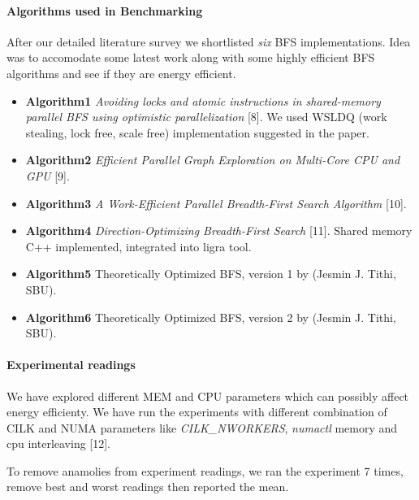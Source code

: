 \paragraph{Algorithms used in Benchmarking}
After our detailed literature survey we shortlisted \emph{six} BFS
implementations.  Idea was to accomodate some latest work along with some
highly efficient BFS algorithms and see if they are energy efficient.
\begin{itemize}[leftmargin=*]
\item \textbf{Algorithm1}
\emph{Avoiding locks and atomic instructions in shared-memory parallel
BFS using optimistic parallelization} [8]. We used WSLDQ (work
stealing, lock free, scale free) implementation suggested in the
paper.
\item \textbf{Algorithm2}
\emph{Efficient Parallel Graph Exploration on Multi-Core CPU and GPU}
[9].
\item \textbf{Algorithm3}
\emph{A Work-Efficient Parallel Breadth-First Search Algorithm} [10].
\item \textbf{Algorithm4}
\emph{Direction-Optimizing Breadth-First Search} [11]. Shared memory
C++ implemented, integrated into ligra tool.
\item \textbf{Algorithm5}
Theoretically Optimized BFS, version 1 by (Jesmin J. Tithi, SBU).
\item \textbf{Algorithm6}
Theoretically Optimized BFS, version 2 by (Jesmin J. Tithi, SBU).

\end{itemize}


\paragraph{Experimental readings}
We have explored different MEM and CPU parameters which can possibly
affect energy efficienty.  We have run the experiments with different
combination of CILK and NUMA parameters like \emph{CILK\_NWORKERS},
\emph{numactl} memory and cpu interleaving [12].

To remove anamolies from experiment readings, we ran the experiment 7
times, remove best and worst readings then reported the mean.



